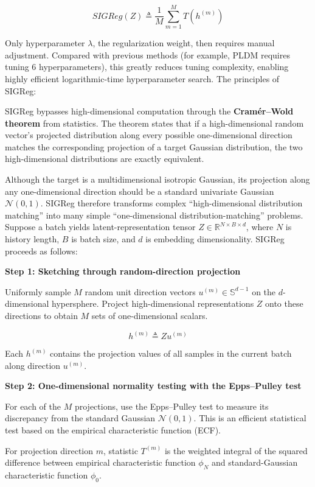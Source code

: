 \[
SIGReg(Z) \triangleq \frac{1}{M}\sum_{m=1}^{M} T(h^{(m)})
\]

Only hyperparameter \(\lambda\), the regularization weight, then requires manual adjustment. Compared with previous methods (for example, PLDM requires tuning \(6\) hyperparameters), this greatly reduces tuning complexity, enabling highly efficient logarithmic-time hyperparameter search.
The principles of SIGReg:

SIGReg bypasses high-dimensional computation through the \textbf{Cramér--Wold theorem} from statistics. The theorem states that if a high-dimensional random vector's projected distribution along every possible one-dimensional direction matches the corresponding projection of a target Gaussian distribution, the two high-dimensional distributions are exactly equivalent.

Although the target is a multidimensional isotropic Gaussian, its projection along any one-dimensional direction should be a standard univariate Gaussian \(\mathcal{N}(0,1)\). SIGReg therefore transforms complex ``high-dimensional distribution matching'' into many simple ``one-dimensional distribution-matching'' problems.
Suppose a batch yields latent-representation tensor \(Z \in \mathbb{R}^{N\times B\times d}\), where \(N\) is history length, \(B\) is batch size, and \(d\) is embedding dimensionality. SIGReg proceeds as follows:

\textbf{Step 1: Sketching through random-direction projection}

Uniformly sample \(M\) random unit direction vectors \(u^{(m)} \in \mathbb{S}^{d-1}\) on the \(d\)-dimensional hypersphere. Project high-dimensional representations \(Z\) onto these directions to obtain \(M\) sets of one-dimensional scalars.

\[
h^{(m)} \triangleq Zu^{(m)}
\]

Each \(h^{(m)}\) contains the projection values of all samples in the current batch along direction \(u^{(m)}\).

\textbf{Step 2: One-dimensional normality testing with the Epps--Pulley test}

For each of the \(M\) projections, use the Epps--Pulley test to measure its discrepancy from the standard Gaussian \(\mathcal{N}(0,1)\). This is an efficient statistical test based on the empirical characteristic function (ECF).

For projection direction \(m\), statistic \(T^{(m)}\) is the weighted integral of the squared difference between empirical characteristic function \(\phi_N\) and standard-Gaussian characteristic function \(\phi_0\).

